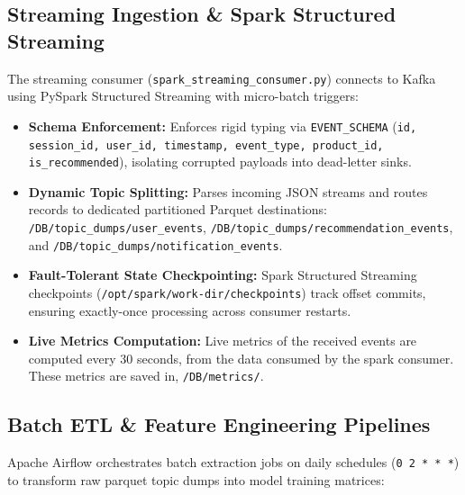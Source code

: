 \documentclass[11pt,a4paper]{article}
\begin{document}
\subsection{Streaming Ingestion \& Spark Structured Streaming}
The streaming consumer (\texttt{spark\_streaming\_consumer.py}) connects to Kafka using PySpark Structured Streaming with micro-batch triggers:
\begin{itemize}
    \item \textbf{Schema Enforcement:} Enforces rigid typing via \texttt{EVENT\_SCHEMA} (\texttt{id, session\_id, user\_id, timestamp, event\_type, product\_id, is\_recommended}), isolating corrupted payloads into dead-letter sinks.
    \item \textbf{Dynamic Topic Splitting:} Parses incoming JSON streams and routes records to dedicated partitioned Parquet destinations: \texttt{/DB/topic\_dumps/user\_events}, \texttt{/DB/topic\_dumps/recommendation\_events}, and \texttt{/DB/topic\_dumps/notification\_events}.
    \item \textbf{Fault-Tolerant State Checkpointing:} Spark Structured Streaming checkpoints (\texttt{/opt/spark/work-dir/checkpoints}) track offset commits, ensuring exactly-once processing across consumer restarts.
    \item \textbf{Live Metrics Computation:} Live metrics of the received events are computed every 30 seconds, from the data consumed by the spark consumer. These metrics are saved in, \texttt{/DB/metrics/}.
\end{itemize}

\subsection{Batch ETL \& Feature Engineering Pipelines}
Apache Airflow orchestrates batch extraction jobs on daily schedules (\texttt{0 2 * * *}) to transform raw parquet topic dumps into model training matrices:
\end{document}
